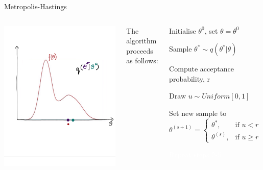 \documentclass[compress]{beamer}
\begin{document}
\begin{frame}[label=sec-7-12]{Metropolis-Hastings}
    \begin{columns}[c] 
    \includegraphics[width=1\linewidth]{MH5}

    The algorithm proceeds as follows:\\
    \begin{enumerate}
        \item Initialise $\theta^{0}$, set $\theta = \theta^{0}$
        \item Sample $\theta^* \sim q(\theta^*|\theta)$
        \item Compute acceptance probability, r
        \item Draw $u \sim Uniform[0,1]$
        \item Set new sample to 
        \[
           \theta^{(s+1)} = 
           \begin{cases}
            \theta^*, & \text{if } u < r\\
            \theta^{(s)}, & \text{if } u \geqslant r
        \end{cases}
    \]
    \textcolor{white}{
        \item[\color{white}] Repeat steps 2-5
    }
\end{enumerate}
\end{columns}
\end{frame}
\end{document}

